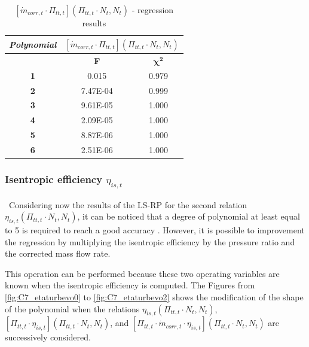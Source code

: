 \begin{longtable}[c]{@{}ccc@{}}
\caption{$[\dot{m}_{corr,t}\cdot \Pi_{tt,t}](\Pi_{tt,t}\cdot N_t,N_t)$ - regression results }
\label{tab:C7_regturb4}\\
\toprule
\textit{\textbf{Polynomial}} & \multicolumn{2}{c}{$[\dot{m}_{corr,t}\cdot \Pi_{tt,t}](\Pi_{tt,t}\cdot N_t,N_t)$} \\* \midrule
\endfirsthead
%
\endhead
%
\bottomrule
\endfoot
%
\endlastfoot
%
\multicolumn{1}{c}{\textbf{Degree}}              & \multicolumn{1}{c}{\textbf{F}}                          & \multicolumn{1}{c}{$\mathbf{\chi^2}$}                         \\
\multicolumn{1}{c}{\textbf{1}}                   & 0.015                               & 0.979                                      \\
\multicolumn{1}{c}{\textbf{2}}                   & 7.47E-04                            & 0.999                                      \\
\multicolumn{1}{c}{\textbf{3}}                   & 9.61E-05                            & 1.000                                      \\
\multicolumn{1}{c}{\textbf{4}}                   & 2.09E-05                            & 1.000                                      \\
\multicolumn{1}{c}{\textbf{5}}                   & 8.87E-06                            & 1.000                                      \\
\multicolumn{1}{c}{\textbf{6}}                   & 2.51E-06                            & 1.000                                      \\* \bottomrule
\end{longtable}


\subsubsection{Isentropic efficiency $\eta_{is,t}$}
\quad\ Considering now the results of the LS-RP for the second relation $\eta_{is,t}(\Pi_{tt,t}\cdot N_t,N_t)$, it can be noticed that a degree of polynomial at least equal to 5 is required to reach a good accuracy . However, it is possible to improvement the regression by multiplying the isentropic efficiency by the pressure ratio and the corrected mass flow rate. 

This operation can be performed because these two operating variables are known when the isentropic efficiency is computed. The Figures from \ref{fig:C7_etaturbevo0} to \ref{fig:C7_etaturbevo2} shows the modification of the shape of the polynomial when the relations $\eta_{is,t}(\Pi_{tt,t}\cdot N_t,N_t)$, $[\Pi_{tt,t}\cdot\eta_{is,t}](\Pi_{tt,t}\cdot N_t,N_t)$, and $[\Pi_{tt,t}\cdot \dot{m}_{corr,t}\cdot\eta_{is,t}](\Pi_{tt,t}\cdot N_t,N_t)$ are successively considered.

